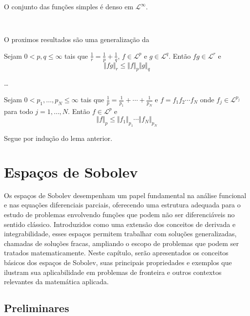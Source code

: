 \documentclass[a4paper, 11pt]{book}
\theoremstyle{definition}
\newcommand{\cL}{\mathcal{L}}
\begin{document}
\begin{tbox}
    O conjunto das funções simples é denso em $\cL^\infty$.
\end{tbox}
\begin{prf}
    ~
\end{prf}

O proximos resultados são uma generalização da 

\begin{lbox}
    Sejam $0 < p, q \leqslant \infty$ tais que $\frac{1}{r} = \frac{1}{p} + \frac{1}{q}$, $f \in \cL^p$ e $g \in \cL^q$.
    Então $fg \in \cL^r$ e
    \[
        \Vert fg \Vert_r \leqslant \Vert f \Vert_p \Vert g \Vert_q
    \]
\end{lbox}
\begin{prf}
    \dots
\end{prf}

\begin{pbox}
    Sejam $0 < p_1,\dots,p_N \leqslant \infty$ tais que $\frac{1}{p} = \frac{1}{p_1} + \cdots + \frac{1}{p_N}$ e $f = f_1 f_2 \cdots f_N$ onde $f_j \in \cL^{p_j}$ para todo $j = 1,\dots,N$. 
    Então $f \in \cL^p$ e 
    \[
        \Vert f \Vert_p \leqslant \Vert f_1 \Vert_{p_1} \cdots \Vert f_N \Vert_{p_N}
    \] 
\end{pbox}
\begin{prf}
    Segue por indução do lema anterior.
\end{prf}

\chapter{Espaços de Sobolev}

Os espaços de Sobolev desempenham um papel fundamental na análise funcional e nas equações diferenciais parciais, oferecendo uma estrutura adequada para o estudo de problemas envolvendo funções que podem não ser diferenciáveis no sentido clássico. Introduzidos como uma extensão dos conceitos de derivada e integrabilidade, esses espaços permitem trabalhar com soluções generalizadas, chamadas de soluções fracas, ampliando o escopo de problemas que podem ser tratados matematicamente. Neste capítulo, serão apresentados os conceitos básicos dos espaços de Sobolev, suas principais propriedades e exemplos que ilustram sua aplicabilidade em problemas de fronteira e outros contextos relevantes da matemática aplicada.

\section{Preliminares}
\end{document}

